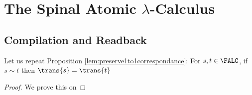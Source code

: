 \appendix

\section{The Spinal Atomic $\lambda$-Calculus}

\subsection{Compilation and Readback}

Let us repeat Proposition \ref{lem:preserve1to1correspondance}: For $s, t \in \FALC$, if $s \sim t$ then $\trans{s} = \trans{t}$ 

\begin{proof}
We prove this on 
\end{proof}